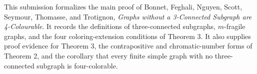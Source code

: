This submission formalizes the main proof of Bonnet, Feghali, Nguyen, Scott,
Seymour, Thomasse, and Trotignon, \emph{Graphs without a 3-Connected Subgraph
are 4-Colourable}.  It records the definitions of three-connected subgraphs,
\(m\)-fragile graphs, and the four coloring-extension conditions of Theorem 3.
It also supplies proof evidence for Theorem 3, the contrapositive and
chromatic-number forms of Theorem 2, and the corollary that every finite simple
graph with no three-connected subgraph is four-colorable.
